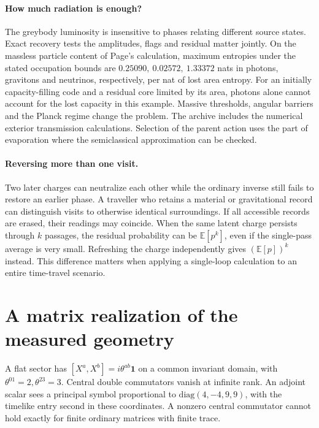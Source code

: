 \documentclass[11pt,a4paper]{article}
\newcommand{\id}{\mathbf1}
\begin{document}
\paragraph{How much radiation is enough?}
The greybody luminosity is insensitive to phases relating different source states. Exact recovery tests the amplitudes, flags and residual matter jointly. On the massless particle content of Page's calculation, maximum entropies under the stated occupation bounds are \(0.25090,\ 0.02572,\ 1.33372\) nats in photons, gravitons and neutrinos, respectively, per nat of lost area entropy. For an initially capacity-filling code and a residual core limited by its area, photons alone cannot account for the lost capacity in this example. Massive thresholds, angular barriers and the Planck regime change the problem. The archive includes the numerical exterior transmission calculations. Selection of the parent action uses the part of evaporation where the semiclassical approximation can be checked.

\paragraph{Reversing more than one visit.}
Two later charges can neutralize each other while the ordinary inverse still fails to restore an earlier phase. A traveller who retains a material or gravitational record can distinguish visits to otherwise identical surroundings. If all accessible records are erased, their readings may coincide. When the same latent charge persists through \(k\) passages, the residual probability can be \(\mathbb E[p^k]\), even if the single-pass average is very small. Refreshing the charge independently gives \((\mathbb E[p])^k\) instead. This difference matters when applying a single-loop calculation to an entire time-travel scenario.

\section{A matrix realization of the measured geometry}
A flat sector has \([X^a,X^b]=i\theta^{ab}\id\) on a common invariant domain, with \(\theta^{01}=2,\theta^{23}=3\). Central double commutators vanish at infinite rank. An adjoint scalar sees a principal symbol proportional to \(\mathrm{diag}(4,-4,9,9)\), with the timelike entry second in these coordinates. A nonzero central commutator cannot hold exactly for finite ordinary matrices with finite trace.
\end{document}
